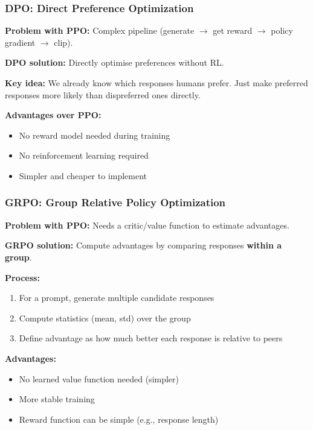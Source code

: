 \bigseparator

\subsubsection{DPO: Direct Preference Optimization}

\begin{defbox}[DPO]
\textbf{Problem with PPO:} Complex pipeline (generate $\to$ get reward $\to$ policy gradient $\to$ clip).

\textbf{DPO solution:} Directly optimise preferences without RL.

\textbf{Key idea:} We already know which responses humans prefer. Just make preferred responses more likely than dispreferred ones directly.

\textbf{Advantages over PPO:}
\begin{itemize}
  \item No reward model needed during training
  \item No reinforcement learning required
  \item Simpler and cheaper to implement
\end{itemize}
\end{defbox}

\bigseparator

\subsubsection{GRPO: Group Relative Policy Optimization}

\begin{defbox}[GRPO]
\textbf{Problem with PPO:} Needs a critic/value function to estimate advantages.

\textbf{GRPO solution:} Compute advantages by comparing responses \textbf{within a group}.

\textbf{Process:}
\begin{enumerate}
  \item For a prompt, generate multiple candidate responses
  \item Compute statistics (mean, std) over the group
  \item Define advantage as how much better each response is relative to peers
\end{enumerate}

\textbf{Advantages:}
\begin{itemize}
  \item No learned value function needed (simpler)
  \item More stable training
  \item Reward function can be simple (e.g., response length)
\end{itemize}
\end{defbox}

